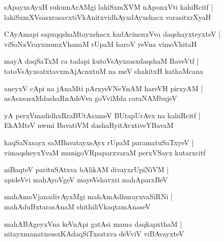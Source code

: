 \documentclass[twoside,12pt,openright]{book}
\newcounter{shloka}[chapter]
\begin{document}
\begin{shloka}%
sApayxsAyxH sukumArAMgi lakiSxmXVM nAponxVti kahiRcitf |\\
lakiSxmXVsasxrasavxtiVkAnitxvidhAyxdAyxshacx varasitxrXyaH 
\end{shloka}

\begin{shloka}%
CAyAmapi sapxqqshaMtayxshacx kadAcinenxVva daqshayxteyxteV |\\
viSoNxVrayxnomxVhanaM rUpaM haroV yeVna vimoVhitaH 
\end{shloka}

\begin{shloka}%
mayA daqSaTxM ca tadapi kutoVsAyxsasxdaqshaM BaveVtf |\\
tatoVsAyxsatxtavxmAjAcnxtuM na meV shakitxH kathaMcana
\end{shloka}

\begin{shloka}%
aneyxV cApi na jAnaMti pArxyeVNeYnAM hareVH pirxyAM |\\
asAsxsasxMdashaRnAdeVva goVviMda caraNAMbujeV 
\end{shloka}

\begin{shloka}%
yA perxVmadidhxRraBUtAsxmeV BUtapUrAvx na kahiRcitf |\\
EkAMteV nwmi BavatiVM dashaRyitAvxtiveYBavaM 
\end{shloka}

\begin{shloka}%
kaqSaNxsayx saMBavatayxsAyx rUpaM paramatuSaTxyeV |\\
vimaqsheyxYvaM munigoVRpaparxvaraM perxVSayx kutarxcitf 
\end{shloka}

\begin{shloka}%
niBaqteV parituSAtxva bAlikAM divayxrUpiNiVM |\\
apideVvi mahAyoVgeV mayeVshavxri mahAparxBeV
\end{shloka}

\begin{shloka}%
mahAmoVjanadivAyxMgi mahAmAdhurayxvaSiRNi |\\
mahAduBxtarasAnaM shithiliVkaqtamAnaseV 
\end{shloka}

\begin{shloka}%
mahABAgeyxVna keVnApi gatAsi mama daqkapxthaM |\\
nitayxmanatxsusxKAdaqSiTxsatxva deVviV viBAvayxteV 
\end{shloka}
\end{document}
